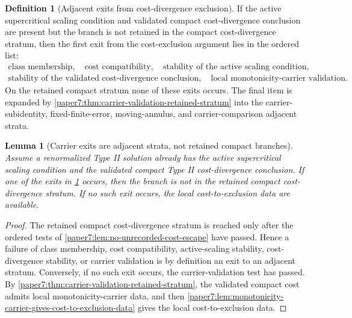\documentclass[11pt]{amsart}
\theoremstyle{plain}
\newtheorem{lemma}[lemma]{Lemma}
\theoremstyle{definition}
\newtheorem{definition}[definition]{Definition}
\theoremstyle{remark}
\begin{document}
\begin{definition}[Adjacent exits from cost-divergence exclusion]
\label{paper7:def:cost-exclusion-missing-hypotheses}
If the active supercritical scaling condition and validated compact
cost-divergence conclusion are present but the branch is not retained in the
compact cost-divergence stratum, then the first exit from the cost-exclusion
argument lies in the ordered list:
\[
  \begin{gathered}
  \text{class membership},\quad
  \text{cost compatibility},\quad
  \text{stability of the active scaling condition},\\
  \text{stability of the validated cost-divergence conclusion},\quad
  \text{local monotonicity-carrier validation}.
  \end{gathered}
\]
On the retained compact stratum none of these exits occurs.  The final item is
expanded by \cref{paper7:thm:carrier-validation-retained-stratum} into the
carrier-subidentity, fixed-finite-error, moving-annulus, and
carrier-comparison adjacent strata.
\end{definition}

\begin{lemma}[Carrier exits are adjacent strata, not retained compact branches]
\label{paper7:lem:missing-hypotheses-not-alternatives}
Assume a renormalized Type II solution already has the active supercritical
scaling condition and the validated compact Type II cost-divergence conclusion.
If one of the exits in \cref{paper7:def:cost-exclusion-missing-hypotheses}
occurs, then the branch is not in the retained compact cost-divergence stratum.
If no such exit occurs, the local cost-to-exclusion data are available.
\end{lemma}

\begin{proof}
The retained compact cost-divergence stratum is reached only after the ordered
tests of \cref{paper7:lem:no-unrecorded-cost-escape} have passed.  Hence a
failure of class membership, cost compatibility, active-scaling stability,
cost-divergence stability, or carrier validation is by definition an exit to an
adjacent stratum.  Conversely, if no such exit occurs, the carrier-validation
test has passed.  By \cref{paper7:thm:carrier-validation-retained-stratum}, the
validated compact cost admits local monotonicity-carrier data, and then
\cref{paper7:lem:monotonicity-carrier-gives-cost-to-exclusion-data} gives the
local cost-to-exclusion data.
\end{proof}
\end{document}
